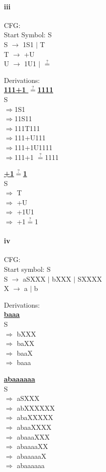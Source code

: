 \documentclass[10pt,letter]{article}
\begin{document}
\paragraph{iii} CFG: \\
Start Symbol: S\\
S $\rightarrow$ 1S1 $\mid$ T \\
T $\rightarrow$ +U \\
U $\rightarrow$ 1U1 $\mid$ $\stackrel{?}{=}$

Derivations:\\
\textbf{\underline{111+1 $\stackrel{?}{=}$1111}} \\
S\\
$\Rightarrow$1S1 \\
$\Rightarrow$11S11 \\
$\Rightarrow$111T111 \\
$\Rightarrow$111+U111 \\
$\Rightarrow$111+1U1111 \\
$\Rightarrow$111+1 $\stackrel{?}{=}$1111



\textbf{\underline{+1$\stackrel{?}{=}$1}} \\
S\\
$\Rightarrow$ T\\
$\Rightarrow$ +U\\
$\Rightarrow$ +1U1\\
$\Rightarrow$ +1$\stackrel{?}{=}$1

\paragraph{iv} CFG: \\
Start symbol: S \\
S $\rightarrow$ aSXXX $\mid$ bXXX $\mid$ SXXXX \\
X $\rightarrow$ a $\mid$ b

Derivations: \\
\textbf{\underline{baaa}} \\
S\\
$\Rightarrow$ bXXX \\
$\Rightarrow$ baXX \\
$\Rightarrow$ baaX \\
$\Rightarrow$ baaa

\textbf{\underline{abaaaaaa}} \\
S\\
$\Rightarrow$ aSXXX \\
$\Rightarrow$ abXXXXXX \\
$\Rightarrow$ abaXXXXX \\
$\Rightarrow$ abaaXXXX \\
$\Rightarrow$ abaaaXXX \\
$\Rightarrow$ abaaaaXX \\
$\Rightarrow$ abaaaaaX \\
$\Rightarrow$ abaaaaaa 
\end{document}
